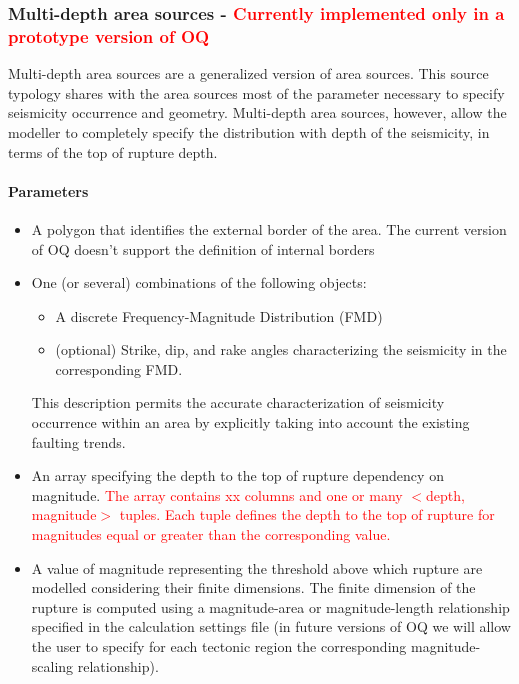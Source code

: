 \subsubsection[Multi-depth area sources]{Multi-depth area sources - 
\textcolor{red}{Currently implemented only in a prototype version of OQ}}
\label{hazard:seismic_source_types:multiDepthAreaSources}
Multi-depth area sources are a generalized version of area sources. This
source typology shares with the area sources most of the parameter 
necessary to specify seismicity  occurrence and geometry. 
%
Multi-depth area sources, however, allow the modeller to completely specify 
the distribution with depth of the seismicity, in terms of the top of 
rupture depth.
%
\paragraph{Parameters}
\begin{itemize}
\item A polygon that identifies the external border of the area. 
The current version of OQ doesn't support the definition 
of internal borders
\item One (or several) combinations of the following objects:
\begin{itemize}
	\item A discrete Frequency-Magnitude Distribution (FMD)
	\item (optional) Strike, dip, and rake angles characterizing the 
	seismicity in the corresponding FMD.
\end{itemize}
%
This description permits the accurate characterization of seismicity 
occurrence within an area by explicitly taking into account the existing 
faulting trends. 
%
\item An array specifying the depth to the top of rupture dependency on 
magnitude. \textcolor{red}{The array contains xx columns and one or many $<$depth, magnitude$>$ 
tuples. Each tuple defines the depth to the top of rupture for magnitudes 
equal or greater than the corresponding value.}
%
\item A value of magnitude representing the threshold above which rupture 
are modelled considering their finite dimensions. The finite dimension of the 
rupture is computed using a magnitude-area or magnitude-length relationship 
specified in the calculation settings file (in future versions of OQ we will 
allow the user to specify for each tectonic region the corresponding 
magnitude-scaling relationship).
\end{itemize}
%
